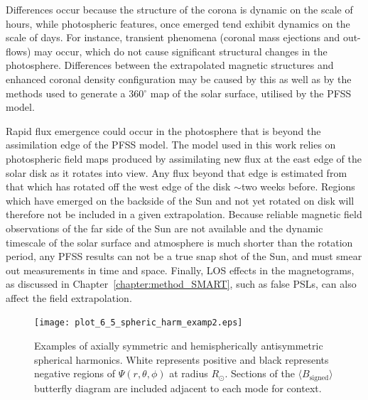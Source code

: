 Differences occur because the structure of the corona is dynamic on the scale of hours, while photospheric features, once emerged tend exhibit dynamics on the scale of days. For instance, transient phenomena (coronal mass ejections and out-flows) may occur, which do not cause significant structural changes in the photosphere. Differences between the extrapolated magnetic structures and enhanced coronal density configuration may be caused by this as well as by the methods used to generate a 360$^\circ$ map of the solar surface, utilised by the \gls{PFSS} model. 

Rapid flux emergence could occur in the photosphere that is beyond the assimilation edge of the \gls{PFSS} model. The model used in this work relies on photospheric field maps produced by assimilating new flux at the east edge of the solar disk as it rotates into view. Any flux beyond that edge is estimated from that which has rotated off the west edge of the disk $\sim$two weeks before. Regions which have emerged on the backside of the Sun and not yet rotated on disk will therefore not be included in a given extrapolation. Because reliable magnetic field observations of the far side of the Sun are not available and the dynamic timescale of the solar surface and atmosphere is much shorter than the rotation period, any \gls{PFSS} results can not be a true snap shot of the Sun, and must smear out measurements in time and space. Finally, \gls{LOS} effects in the magnetograms, as discussed in Chapter~\ref{chapter:method_SMART}, such as false \glspl{PSL}, can also affect the field extrapolation.

\begin{figure}[!t]
\centerline{\texttt{[image: plot\_6\_5\_spheric\_harm\_examp2.eps]}}
\caption[Spherical harmonic visualisations.]{Examples of axially symmetric and hemispherically antisymmetric spherical harmonics. White represents positive and black represents negative regions of $\Psi(r,\theta,\phi)$ at radius $R_{\odot}$. Sections of the $\langle B_{\mathrm{signed}} \rangle$ butterfly diagram are included adjacent to each mode for context.}
\label{plot_6_5_spheric_harm_examp}
\end{figure}

